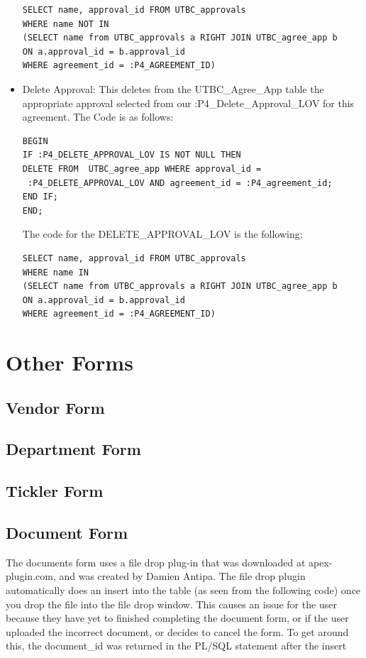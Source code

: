\documentclass{report}
\begin{document}
\begin{itemize}
\begin{lstlisting}
SELECT name, approval_id FROM UTBC_approvals
WHERE name NOT IN 
(SELECT name from UTBC_approvals a RIGHT JOIN UTBC_agree_app b 
ON a.approval_id = b.approval_id
WHERE agreement_id = :P4_AGREEMENT_ID)
\end{lstlisting}

\item Delete Approval:  This deletes from the UTBC\_Agree\_App table the appropriate approval selected from our :P4\_Delete\_Approval\_LOV for this agreement.  The Code is as follows: 

\begin{lstlisting}
BEGIN
IF :P4_DELETE_APPROVAL_LOV IS NOT NULL THEN
DELETE FROM  UTBC_agree_app WHERE approval_id =
 :P4_DELETE_APPROVAL_LOV AND agreement_id = :P4_agreement_id;
END IF;
END;
\end{lstlisting}
The code for the DELETE\_APPROVAL\_LOV is the following: 

\begin{lstlisting}
SELECT name, approval_id FROM UTBC_approvals
WHERE name IN 
(SELECT name from UTBC_approvals a RIGHT JOIN UTBC_agree_app b 
ON a.approval_id = b.approval_id 
WHERE agreement_id = :P4_AGREEMENT_ID)
\end{lstlisting}

\end{itemize}


\section{Other Forms}

\subsection{Vendor Form}

\subsection{Department Form}

\subsection{Tickler Form}

\subsection{Document Form}
The documents form uses a file drop plug-in that was downloaded at apex-plugin.com, and was created by Damien Antipa. The file drop plugin automatically does an insert into the table (as seen from the following code) once you drop the file into the file drop window. This causes an issue for the user because they have yet to finished completing the document form, or if the user uploaded the incorrect document, or decides to cancel the form. To get around this, the document\_id was returned in the PL/SQL statement after the insert
\end{document}
